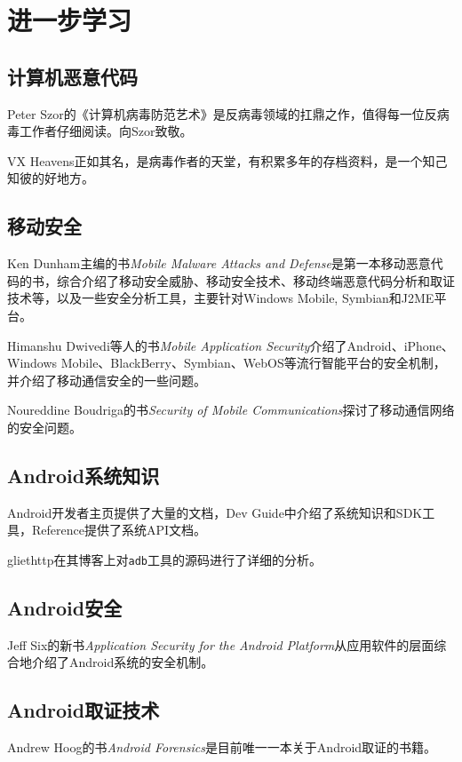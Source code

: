 \chapter{进一步学习}
\section*{计算机恶意代码}
Peter Szor的《计算机病毒防范艺术》\cite{art_virus}是反病毒领域的扛鼎之作，值得每一位反病毒工作者仔细阅读。向Szor致敬。

VX Heavens\cite{url:vx_heavens}正如其名，是病毒作者的天堂，有积累多年的存档资料，是一个知己知彼的好地方。

\section*{移动安全}
Ken Dunham主编的书{\it Mobile Malware Attacks and Defense}\cite{mobile_malware}是第一本移动恶意代码的书，综合介绍了移动安全威胁、移动安全技术、移动终端恶意代码分析和取证技术等，以及一些安全分析工具，主要针对Windows Mobile, Symbian和J2ME平台。

Himanshu Dwivedi等人的书{\it Mobile Application Security}\cite{mobile_app_security}介绍了Android、iPhone、Windows Mobile、BlackBerry、Symbian、WebOS等流行智能平台的安全机制，并介绍了移动通信安全的一些问题。

Noureddine Boudriga的书{\it Security of Mobile Communications}\cite{security_mobile_comm}探讨了移动通信网络的安全问题。

\section*{Android系统知识}
Android开发者主页\cite{url:android_dev}提供了大量的文档，Dev Guide中介绍了系统知识和SDK工具，Reference提供了系统API文档。

gliethttp在其博客\cite{url:blog_gliethttp}上对\lstinline!adb!工具的源码进行了详细的分析。

\section*{Android安全}
Jeff Six的新书{\it Application Security for the Android Platform}\cite{android_app_security}从应用软件的层面综合地介绍了Android系统的安全机制。

\section*{Android取证技术}
Andrew Hoog的书{\it Android Forensics}\cite{android_forensics}是目前唯一一本关于Android取证的书籍。


